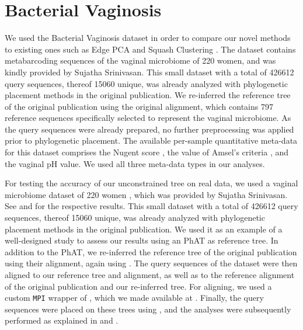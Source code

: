 
\section{Bacterial Vaginosis}
\label{supp:sec:DetailsEmpiricalDatasets:sub:BV}

We used the Bacterial Vaginosis dataset \cite{Srinivasan2012} in order to compare our novel methods to
existing ones such as Edge PCA and Squash Clustering \cite{Matsen2011a,Evans2012}.
The dataset contains metabarcoding sequences of the vaginal microbiome of \num{220} women,
and was kindly provided by Sujatha Srinivasan.
This small dataset with a total of \num{426 612} query sequences, thereof \num{15 060} unique,
was already analyzed with phylogenetic placement methods in the original publication.
We re-inferred the reference tree of the original publication using the original alignment,
which contains \num{797} reference sequences specifically selected to represent the vaginal microbiome.
As the query sequences were already prepared,
no further preprocessing was applied prior to phylogenetic placement.
The available per-sample quantitative meta-data for this dataset comprises
the Nugent score \cite{Nugent1991}, the value of Amsel's criteria \cite{Amsel1983}, and the vaginal pH value.
We used all three meta-data types in our analyses.


For testing the accuracy of our unconstrained  tree on real data,
we used a vaginal microbiome dataset of 220 women \citep{Srinivasan2012},
which was provided by Sujatha Srinivasan.
See  and  for the respective results.
This small dataset with a total of \num{426 612} query sequences, thereof \num{15 060} unique,
was already analyzed with phylogenetic placement methods in the original publication.
We used it as an example of a well-designed study to assess our results using an \ac{PhAT} as reference tree.
In addition to the  \ac{PhAT},
we re-inferred the reference tree of the original publication using their alignment,
again using  \citep{Stamatakis2014}.
The query sequences of the dataset were then aligned to our reference tree and alignment,
as well as to the reference alignment of the original publication and our re-inferred tree.
For aligning, we used a custom \texttt{\acs{MPI}} wrapper of  \citep{Berger2011a,Berger2012},
which we made available at \citep{PaPaRaMPI}.
Finally, the query sequences were placed on these trees using  \citep{Barbera2018},
and the analyses were subsequently performed as explained in  and .

